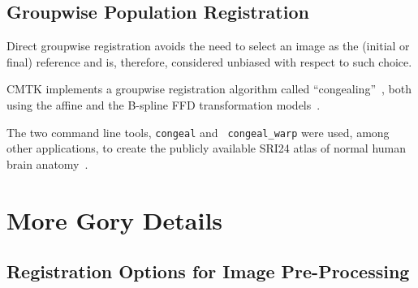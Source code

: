 \documentclass{InsightArticle}
\begin{document}
\subsection{Groupwise Population Registration}

Direct groupwise registration avoids the need to select an image as the
(initial or final) reference and is, therefore, considered unbiased with
respect to such choice.

CMTK implements a groupwise registration algorithm called
``congealing''~\cite{Learned-Miller:2006}, both using the affine and the
B-spline FFD transformation models~\cite{BalcGollShen:2007}.

  The two command line tools, {\tt congeal} and {\tt
congeal\_warp} were used, among other applications, to create the publicly
available SRI24 atlas  of normal human brain
anatomy~\cite{RohlZahrSull:2008,RohlZahrSull:2010}.

\clearpage
\section{More Gory Details}

\subsection{Registration Options for Image Pre-Processing}
\end{document}
